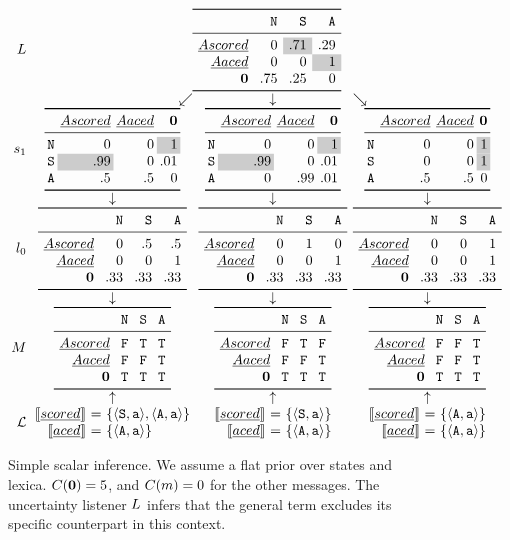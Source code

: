 \documentclass[leqno]{article}
\begin{document}
\begin{figure}[h!]
  \[
  \setlength{\arraycolsep}{2pt}
  \begin{array}{r c c c}
    \UncertaintyListener &
    \multicolumn{3}{c}{\genericscalar{0}{\graycell{.71}}{.29}{0}{0}{\graycell{1}}{.75}{.25}{0}}
    \\
    & \multicolumn{1}{r}{\swarrow} & \multicolumn{1}{c}{\downarrow} & \multicolumn{1}{l}{\searrow} 
    \\
    \speakerOne
    &
    \scalarspeaker{0}{0}{\graycell{1}}{\graycell{.99}}{0}{.01}{.5}{.5}{0}
    &
    \scalarspeaker{0}{0}{\graycell{1}}{\graycell{.99}}{0}{.01}{0}{.99}{.01}
    &
    \scalarspeaker{0}{0}{\graycell{1}}{0}{0}{\graycell{1}}{.5}{.5}{0}
    \\
    & \downarrow & \downarrow & \downarrow
    \\
    \listenerZero
    &
    \genericscalar{0}{.5}{.5}{0}{0}{1}{.33}{.33}{.33}
    &
    \genericscalar{0}{1}{0}{0}{0}{1}{.33}{.33}{.33}
    &
    \genericscalar{0}{0}{1}{0}{0}{1}{.33}{.33}{.33}
    \\
    & \downarrow & \downarrow & \downarrow 
    \\    
    \Messages
    &
    \genericscalar{\False}{\True}{\True}{\False}{\False}{\True}{\True}{\True}{\True}
    &
    \genericscalar{\False}{\True}{\False}{\False}{\False}{\True}{\True}{\True}{\True}
    &
    \genericscalar{\False}{\False}{\True}{\False}{\False}{\True}{\True}{\True}{\True}
    \\
    & \uparrow & \uparrow & \uparrow 
    \\                               
    \Lex
    & 
    \scalarlex{\tuple{\world{S},\playera}, \tuple{\world{A},\playera}}
    & 
    \scalarlex{\tuple{\world{S},\playera}}
    &
    \scalarlex{\tuple{\world{A},\playera}}   
  \end{array}
  \]
  \caption{Simple scalar inference. We assume a flat prior over states
    and lexica. $C(\mathbf{0}) = 5$, and $C(m) = 0$ for
    the other messages. The uncertainty listener $L$
    infers that the general term  excludes its specific counterpart
     in this context.}
  \label{fig:simplescalar}
\end{figure}
\end{document}
